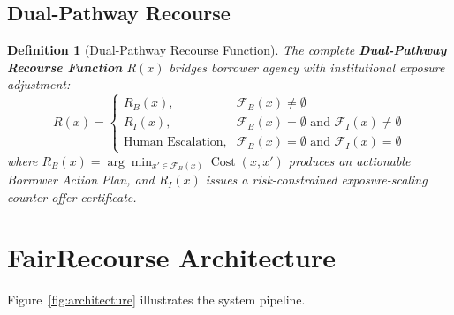 \documentclass[manuscript,screen,review,anonymous]{acmart}
\newtheorem{definition}{Definition}
\begin{document}
\subsection{Dual-Pathway Recourse}
\begin{definition}[Dual-Pathway Recourse Function]
The complete \textbf{Dual-Pathway Recourse Function} $R(x)$ bridges borrower agency with institutional exposure adjustment:
\begin{equation}
R(x) = \begin{cases}
R_B(x), & \mathcal{F}_B(x) \neq \emptyset \\
R_I(x), & \mathcal{F}_B(x) = \emptyset \text{ and } \mathcal{F}_I(x) \neq \emptyset \\
\text{Human Escalation}, & \mathcal{F}_B(x) = \emptyset \text{ and } \mathcal{F}_I(x) = \emptyset
\end{cases}
\label{eq:dual_pathway}
\end{equation}
where $R_B(x) = \arg\min_{x' \in \mathcal{F}_B(x)} \operatorname{Cost}(x, x')$ produces an actionable Borrower Action Plan, and $R_I(x)$ issues a risk-constrained exposure-scaling counter-offer certificate.
\end{definition}

\section{FairRecourse Architecture}

Figure~\ref{fig:architecture} illustrates the system pipeline.
\end{document}
